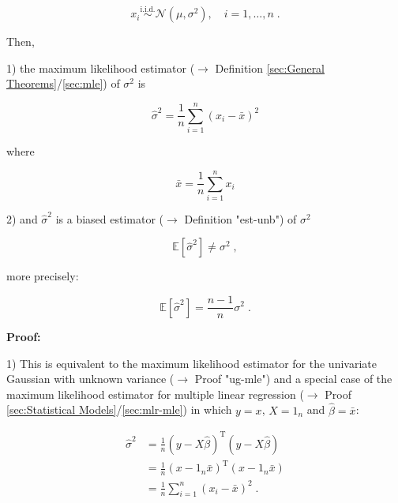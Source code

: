 \documentclass[a4paper,12pt,twoside]{book}
\begin{document}
\begin{equation} \label{eq:resvar-bias-ug}
x_i \overset{\text{i.i.d.}}{\sim} \mathcal{N}(\mu, \sigma^2), \quad i = 1,\ldots,n \; .
\end{equation}

Then,

1) the maximum likelihood estimator ($\rightarrow$ Definition \ref{sec:General Theorems}/\ref{sec:mle}) of $\sigma^2$ is

\begin{equation} \label{eq:resvar-bias-resvar-mle}
\hat{\sigma}^2 = \frac{1}{n} \sum_{i=1}^{n} \left( x_i - \bar{x} \right)^2
\end{equation}

where

\begin{equation} \label{eq:resvar-bias-mean-mle}
\bar{x} = \frac{1}{n} \sum_{i=1}^{n} x_i
\end{equation}

2) and $\hat{\sigma}^2$ is a biased estimator ($\rightarrow$ Definition "est-unb") of $\sigma^2$

\begin{equation} \label{eq:resvar-bias-resvar-var}
\mathbb{E}\left[ \hat{\sigma}^2 \right] \neq \sigma^2 \; ,
\end{equation}

more precisely:

\begin{equation} \label{eq:resvar-bias-resvar-bias}
\mathbb{E}\left[ \hat{\sigma}^2 \right] = \frac{n-1}{n} \sigma^2 \; .
\end{equation}


\vspace{1em}
\textbf{Proof:}

1) This is equivalent to the maximum likelihood estimator for the univariate Gaussian with unknown variance ($\rightarrow$ Proof "ug-mle") and a special case of the maximum likelihood estimator for multiple linear regression ($\rightarrow$ Proof \ref{sec:Statistical Models}/\ref{sec:mlr-mle}) in which $y = x$, $X = 1_n$ and $\hat{\beta} = \bar{x}$:

\begin{equation} \label{eq:resvar-bias-resvar-mle-qed}
\begin{split}
\hat{\sigma}^2 &= \frac{1}{n} (y-X\hat{\beta})^\mathrm{T} (y-X\hat{\beta}) \\
&= \frac{1}{n} (x - 1_n \bar{x})^\mathrm{T} (x - 1_n \bar{x}) \\
&= \frac{1}{n} \sum_{i=1}^{n} \left( x_i - \bar{x} \right)^2 \; .
\end{split}
\end{equation}
\end{document}
